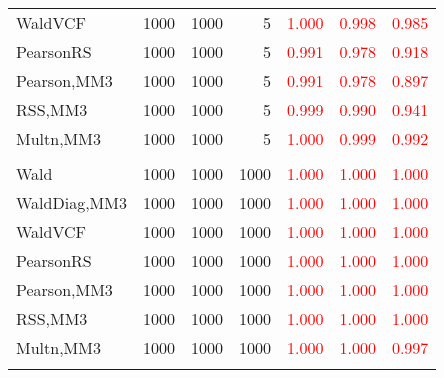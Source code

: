 \documentclass[
]{article}
\begin{document}
\begin{table}[H]
{\begin{tabular}[t]{lrrrrrr}
\hspace{1em}WaldVCF & 1000 & 1000 & 5 & \textcolor{red}{1.000} & \textcolor{red}{0.998} & \textcolor{red}{0.985}\\
\hspace{1em}PearsonRS & 1000 & 1000 & 5 & \textcolor{red}{0.991} & \textcolor{red}{0.978} & \textcolor{red}{0.918}\\
\hspace{1em}Pearson,MM3 & 1000 & 1000 & 5 & \textcolor{red}{0.991} & \textcolor{red}{0.978} & \textcolor{red}{0.897}\\
\hspace{1em}RSS,MM3 & 1000 & 1000 & 5 & \textcolor{red}{0.999} & \textcolor{red}{0.990} & \textcolor{red}{0.941}\\
\hspace{1em}Multn,MM3 & 1000 & 1000 & 5 & \textcolor{red}{1.000} & \textcolor{red}{0.999} & \textcolor{red}{0.992}\\
\addlinespace[0.3em]
\multicolumn{7}{l}{\textbf{1F 15V}}\\
\hspace{1em}Wald & 1000 & 1000 & 1000 & \textcolor{red}{1.000} & \textcolor{red}{1.000} & \vphantom{1} \textcolor{red}{1.000}\\
\hspace{1em}WaldDiag,MM3 & 1000 & 1000 & 1000 & \textcolor{red}{1.000} & \textcolor{red}{1.000} & \textcolor{red}{1.000}\\
\hspace{1em}WaldVCF & 1000 & 1000 & 1000 & \textcolor{red}{1.000} & \textcolor{red}{1.000} & \vphantom{1} \textcolor{red}{1.000}\\
\hspace{1em}PearsonRS & 1000 & 1000 & 1000 & \textcolor{red}{1.000} & \textcolor{red}{1.000} & \textcolor{red}{1.000}\\
\hspace{1em}Pearson,MM3 & 1000 & 1000 & 1000 & \textcolor{red}{1.000} & \textcolor{red}{1.000} & \textcolor{red}{1.000}\\
\hspace{1em}RSS,MM3 & 1000 & 1000 & 1000 & \textcolor{red}{1.000} & \textcolor{red}{1.000} & \textcolor{red}{1.000}\\
\hspace{1em}Multn,MM3 & 1000 & 1000 & 1000 & \textcolor{red}{1.000} & \textcolor{red}{1.000} & \textcolor{red}{0.997}\\
\addlinespace[0.3em]
\multicolumn{7}{l}{\textbf{2F 10V}}\\

\end{tabular}}
\end{table}
\end{document}

